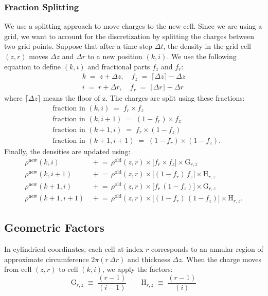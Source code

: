 \subsubsection*{Fraction Splitting}\label{ch3:sec:frac_split}
We use a splitting approach to move charges to the new cell. Since we are using a grid, we want to account for the discretization by splitting the charges between two grid points. Suppose that after a time step $\Delta t$, the density in the grid cell $(z,r)$ moves $\Delta z$ and $\Delta r$ to a new position $(k,i)$. We use the following equation to define $(k,i)$ and fractional parts $f_z$ and $f_r$:
\begin{align}
k \;=\; z + \Delta z,\quad
f_z \;=\; \lceil \Delta z \rceil - \Delta z\\
i \;=\; r + \Delta r ,\quad
f_r \;=\; \lceil \Delta r \rceil - \Delta r
\end{align}
where $\lceil \Delta z \rceil$ means the floor of z. The charges are split using these fractions:
\begin{align}
&\text{fraction in }(k, i)   \;=\; f_{r} \times f_{z} \\
&\text{fraction in }(k, i+1) \;=\; (1 - f_{r}) \times f_{z}\\
&\text{fraction in }(k+1, i) \;=\; f_{r} \times (1 - f_{z})\\
&\text{fraction in }(k+1, i+1)\;=\; (1 - f_{r}) \times (1 - f_{z}).
\label{eq:bilinear-fractions}
\end{align}
Finally, the densities are updated using:
\begin{align}
\rho^{\mathrm{new}}(k,i)   &\,\mathrel{+}=\, \rho^{\mathrm{old}}(z,r)\times \bigl[f_{r}\times f_{z}\bigr] \times \text{G}_{r,z} \label{ch3:eq:den_update_1} \\
\rho^{\mathrm{new}}(k,i+1) &\,\mathrel{+}=\, \rho^{\mathrm{old}}(z,r)\times \bigl[(1 - f_{r})\,f_{z}\bigr] \times \text{H}_{r,z} \label{ch3:eq:den_update_2} \\
\rho^{\mathrm{new}}(k+1,i) &\,\mathrel{+}=\, \rho^{\mathrm{old}}(z,r)\times \bigl[f_{r}\,(1 - f_{z})\bigr] \times \text{G}_{r,z} \label{ch3:eq:den_update_3} \\
\rho^{\mathrm{new}}(k+1,i+1)&\,\mathrel{+}=\, \rho^{\mathrm{old}}(z,r)\times \bigl[(1 - f_{r})\,(1 - f_{z})\bigr] \times \text{H}_{r,z}. \label{ch3:eq:den_update_4}
\end{align}


\subsection{Geometric Factors}
\label{sec:geom-factor}
In cylindrical coordinates, each cell at index $r$ corresponds to an annular region of approximate circumference $2\pi (r \,\Delta r)$ and thickness $\Delta z$. When the charge moves from cell $(z,r)$ to cell $(k,i)$, we apply the factors:
\[
\text{G}_{r,z} \;\equiv\; \frac{(r-1)}{(i-1)}
\qquad
\text{H}_{r,z} \;\equiv\; \frac{(r-1)}{(i)}
\] 


